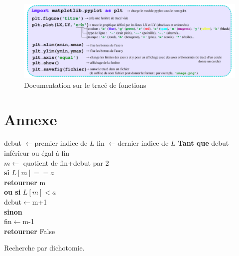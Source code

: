 \begin{figure}[h]
\includegraphics[scale=0.5]{memento_plt}
\caption{Documentation sur le tracé de fonctions}
\end{figure}



\section{Annexe}


\begin{algorithm}[H]
debut $\leftarrow $premier indice de $L$ \;
fin $\leftarrow $dernier indice de $L$ \;
\textbf{Tant que} debut inférieur ou égal à fin \\
\qquad $m \leftarrow $ quotient de fin+debut par $2$\\
\qquad \textbf{si} $L[m] == a$\\
\qquad \qquad \textbf{retourner} m\\
\qquad \textbf{ou si} $L[m]<a$\\
\qquad \qquad debut$\leftarrow $m+1\\
\qquad \textbf{sinon}\\
\qquad \qquad fin$\leftarrow $m-1\\
\textbf{retourner} False
\caption{Recherche par dichotomie.}
\end{algorithm}































